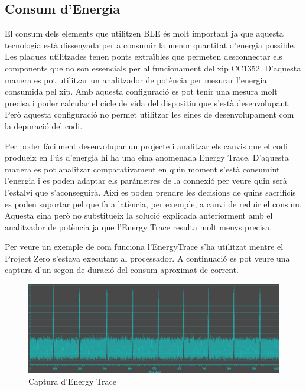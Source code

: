 \subsection{Consum d'Energia}

El consum dels elements que utilitzen BLE és molt important ja que aquesta tecnologia està dissenyada per a consumir la menor quantitat d'energia possible.
Les plaques utilitzades tenen ponts extraïbles que permeten desconnectar els components que no son essencials per al funcionament del xip CC1352.
D'aquesta manera es pot utilitzar un analitzador de potència per mesurar l'energia consumida pel xip.
Amb aquesta configuració es pot tenir una mesura molt precisa i poder calcular el cicle de vida del dispositiu que s'està desenvolupant.
Però aquesta configuració no permet utilitzar les eines de desenvolupament com la depuració del codi.

Per poder fàcilment desenvolupar un projecte i analitzar els canvis que el codi produeix en l'ús d'energia hi ha una eina anomenada Energy Trace.
D'aquesta manera es pot analitzar comparativament en quin moment s'està consumint l'energia i es poden adaptar els paràmetres de la connexió per veure quin serà l'estalvi que s'aconseguirà.
Així es poden prendre les decisions de quins sacrificis es poden suportar pel que fa a latència, per exemple, a canvi de reduir el consum.
Aquesta eina però no substitueix la solució explicada anteriorment amb el analitzador de potència ja que l'Energy Trace resulta molt menys precisa.

Per veure un exemple de com funciona l'EnergyTrace s'ha utilitzat mentre el Project Zero s'estava executant al processador. A continuació es pot veure una captura d'un segon de duració del consum aproximat de corrent.
\begin{figure}[!h]
	\begin{center}
		\includegraphics[width=\textwidth]{./images/energy_trace.png}
		\caption{Captura d'Energy Trace}
	\end{center}
\end{figure}

